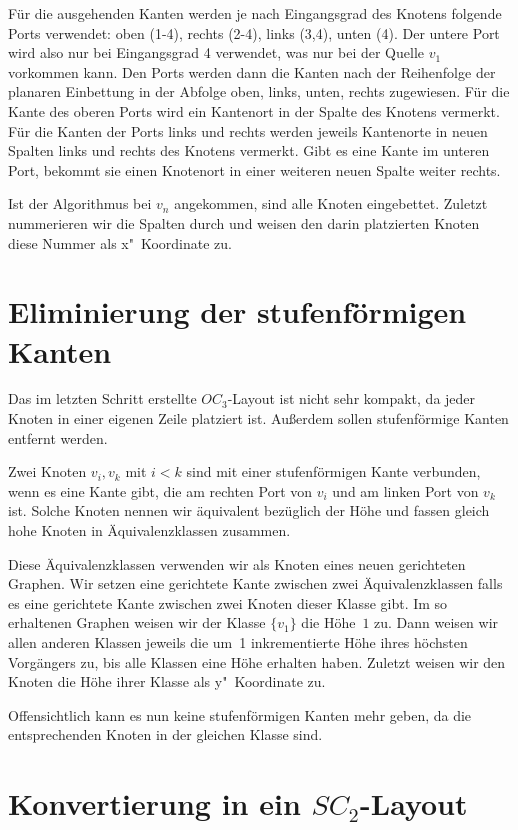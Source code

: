 \documentclass[a4paper]{scrreprt}
\theoremstyle{definition}
\begin{document}
Für die ausgehenden Kanten werden je nach Eingangsgrad des Knotens folgende Ports verwendet: oben (1-4), rechts (2-4), links (3,4), unten (4). Der untere Port wird also nur bei Eingangsgrad 4 verwendet, was nur bei der Quelle $v_1$ vorkommen kann. Den Ports werden dann die Kanten nach der Reihenfolge der planaren Einbettung in der Abfolge oben, links, unten, rechts zugewiesen. 
Für die Kante des oberen Ports wird ein Kantenort in der Spalte des Knotens vermerkt. Für die Kanten der Ports links und rechts werden jeweils Kantenorte in neuen Spalten links und rechts des Knotens vermerkt. Gibt es eine Kante im unteren Port, bekommt sie einen Knotenort in einer weiteren neuen Spalte weiter rechts. %

Ist der Algorithmus bei $v_n$ angekommen, sind alle Knoten eingebettet. Zuletzt nummerieren wir die Spalten durch und weisen den darin platzierten Knoten diese Nummer als x"~Koordinate zu. 

\section{Eliminierung der stufenförmigen Kanten}

Das im letzten Schritt erstellte $OC_3$-Layout ist nicht sehr kompakt, da jeder Knoten in einer eigenen Zeile platziert ist. Außerdem sollen stufenförmige Kanten entfernt werden.

Zwei Knoten $v_i, v_k$ mit $i < k$ sind mit einer stufenförmigen Kante verbunden, wenn es eine Kante gibt, die am rechten Port von $v_i$ und am linken Port von $v_k$ ist. Solche Knoten nennen wir äquivalent bezüglich der Höhe und fassen gleich hohe Knoten in Äquivalenzklassen zusammen.

Diese Äquivalenzklassen verwenden wir als Knoten eines neuen gerichteten Graphen. Wir setzen eine gerichtete Kante zwischen zwei Äquivalenzklassen falls es eine gerichtete Kante zwischen zwei Knoten dieser Klasse gibt. Im so erhaltenen Graphen weisen wir der Klasse $\{v_1\}$ die Höhe~$1$ zu. Dann weisen wir allen anderen Klassen jeweils die um~1 inkrementierte Höhe ihres höchsten Vorgängers zu, bis alle Klassen eine Höhe erhalten haben. Zuletzt weisen wir den Knoten die Höhe ihrer Klasse als y"~Koordinate zu.

Offensichtlich kann es nun keine stufenförmigen Kanten mehr geben, da die entsprechenden Knoten in der gleichen Klasse sind.

\section{Konvertierung in ein $SC_2$-Layout}
\end{document}
